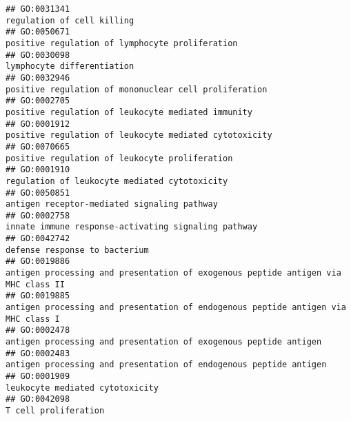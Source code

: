 \documentclass[
]{article}
\begin{document}
\begin{verbatim}
## GO:0031341                                                                                                                       regulation of cell killing
## GO:0050671                                                                                                  positive regulation of lymphocyte proliferation
## GO:0030098                                                                                                                       lymphocyte differentiation
## GO:0032946                                                                                            positive regulation of mononuclear cell proliferation
## GO:0002705                                                                                               positive regulation of leukocyte mediated immunity
## GO:0001912                                                                                           positive regulation of leukocyte mediated cytotoxicity
## GO:0070665                                                                                                   positive regulation of leukocyte proliferation
## GO:0001910                                                                                                    regulation of leukocyte mediated cytotoxicity
## GO:0050851                                                                                                      antigen receptor-mediated signaling pathway
## GO:0002758                                                                                              innate immune response-activating signaling pathway
## GO:0042742                                                                                                                    defense response to bacterium
## GO:0019886                                                                antigen processing and presentation of exogenous peptide antigen via MHC class II
## GO:0019885                                                                antigen processing and presentation of endogenous peptide antigen via MHC class I
## GO:0002478                                                                                 antigen processing and presentation of exogenous peptide antigen
## GO:0002483                                                                                antigen processing and presentation of endogenous peptide antigen
## GO:0001909                                                                                                                  leukocyte mediated cytotoxicity
## GO:0042098                                                                                                                             T cell proliferation

\end{verbatim}
\end{document}
